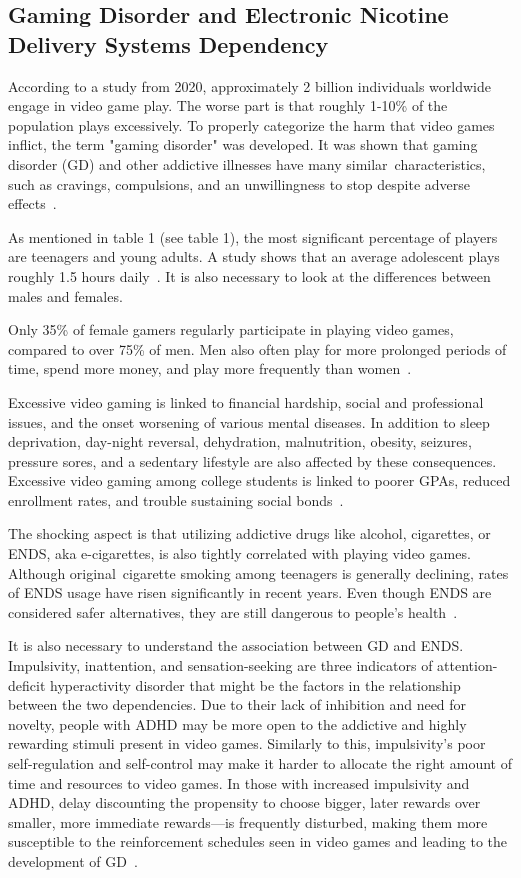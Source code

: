 \documentclass[10pt,twoside,english,a4paper]{article}
\begin{document}
\subsection{Gaming Disorder and Electronic Nicotine Delivery Systems Dependency} \label{GD and ENDS}
According to a study from 2020, approximately 2 billion individuals worldwide engage in video game play. The worse part is that roughly 1-10\% of the population plays excessively. To properly categorize the harm that video games inflict, the term "gaming disorder" was developed. It was shown that gaming disorder (GD) and other addictive illnesses have many similar characteristics, such as cravings, compulsions, and an unwillingness to stop despite adverse effects~\cite{disorder}.

As mentioned in table 1 (see table 1), the most significant percentage of players are teenagers and young adults. A study shows that an average adolescent plays roughly 1.5 hours daily~\cite{disorder}. It is also necessary to look at the differences between males and females.

Only 35\% of female gamers regularly participate in playing video games, compared to over 75\% of men. Men also often play for more prolonged periods of time, spend more money, and play more frequently than women~\cite{disorder}. 

Excessive video gaming is linked to financial hardship, social and professional issues, and the onset worsening of various mental diseases. In addition to sleep deprivation, day-night reversal, dehydration, malnutrition, obesity, seizures, pressure sores, and a sedentary lifestyle are also affected by these consequences. Excessive video gaming among college students is linked to poorer GPAs, reduced enrollment rates, and trouble sustaining social bonds~\cite{disorder}.

The shocking aspect is that utilizing addictive drugs like alcohol, cigarettes, or ENDS, aka e-cigarettes, is also tightly correlated with playing video games. Although original cigarette smoking among teenagers is generally declining, rates of ENDS usage have risen significantly in recent years. Even though ENDS are considered safer alternatives, they are still dangerous to people's health~\cite{disorder}.

It is also necessary to understand the association between GD and ENDS. Impulsivity, inattention, and sensation-seeking are three indicators of attention-deficit hyperactivity disorder that might be the factors in the relationship between the two dependencies. Due to their lack of inhibition and need for novelty, people with ADHD may be more open to the addictive and highly rewarding stimuli present in video games. Similarly to this, impulsivity's poor self-regulation and self-control may make it harder to allocate the right amount of time and resources to video games. In those with increased impulsivity and ADHD, delay discounting the propensity to choose bigger, later rewards over smaller, more immediate rewards—is frequently disturbed, making them more susceptible to the reinforcement schedules seen in video games and leading to the development of GD~\cite{disorder}.
\end{document}
